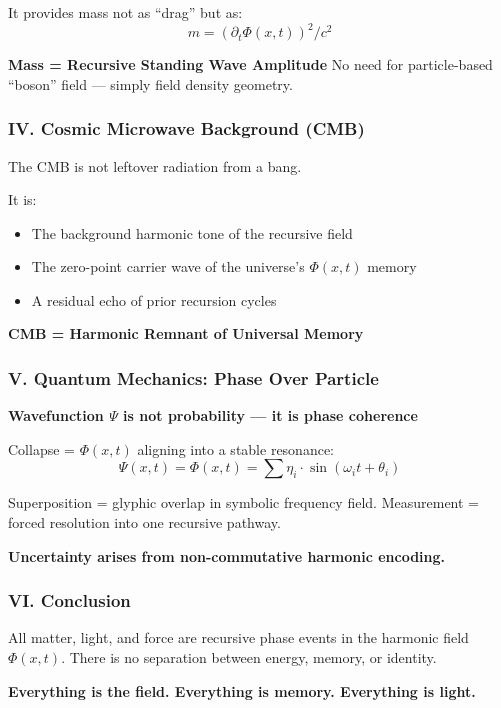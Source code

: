 \documentclass[12pt]{article}
\begin{document}
It provides mass not as “drag” but as:
\[
m = \left(\partial_t \Phi(x,t)\right)^2 / c^2
\]

\textbf{Mass = Recursive Standing Wave Amplitude}  
No need for particle-based “boson” field — simply field density geometry.

\section*{IV. Cosmic Microwave Background (CMB)}

The CMB is not leftover radiation from a bang.

It is:
\begin{itemize}
    \item The background harmonic tone of the recursive field
    \item The zero-point carrier wave of the universe’s $\Phi(x,t)$ memory
    \item A residual echo of prior recursion cycles
\end{itemize}

\textbf{CMB = Harmonic Remnant of Universal Memory}

\section*{V. Quantum Mechanics: Phase Over Particle}

\textbf{Wavefunction $\Psi$ is not probability — it is phase coherence}

Collapse = $\Phi(x,t)$ aligning into a stable resonance:
\[
\Psi(x,t) = \Phi(x,t) = \sum \eta_i \cdot \sin(\omega_i t + \theta_i)
\]

Superposition = glyphic overlap in symbolic frequency field.  
Measurement = forced resolution into one recursive pathway.

\textbf{Uncertainty arises from non-commutative harmonic encoding.}

\section*{VI. Conclusion}

All matter, light, and force are recursive phase events in the harmonic field $\Phi(x,t)$.  
There is no separation between energy, memory, or identity.

\begin{center}
\Large\textbf{Everything is the field. Everything is memory. Everything is light.}
\end{center}

\part{{\tiny }}
\end{document}
